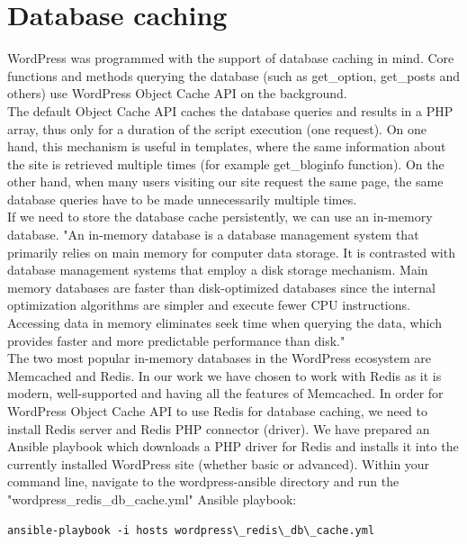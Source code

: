 \section{Database caching}

WordPress was programmed with the support of database caching in mind. Core functions and methods querying the database (such as get\_option, get\_posts and others) use WordPress Object Cache API \cite{WP:Object-Cache-API} on the background. \\

The default Object Cache API caches the database queries and results in a PHP array, thus only for a duration of the script execution (one request). On one hand, this mechanism is useful in templates, where the same information about the site is retrieved multiple times (for example get\_bloginfo function). On the other hand, when many users visiting our site request the same page, the same database queries have to be made unnecessarily multiple times. \\

If we need to store the database cache persistently, we can use an in-memory database. "An in-memory database is a database management system that primarily relies on main memory for computer data storage. It is contrasted with database management systems that employ a disk storage mechanism. Main memory databases are faster than disk-optimized databases since the internal optimization algorithms are simpler and execute fewer CPU instructions. Accessing data in memory eliminates seek time when querying the data, which provides faster and more predictable performance than disk." \cite{Wiki:in-memory-database}\\

The two most popular in-memory databases in the WordPress ecosystem are Memcached and Redis. In our work we have chosen to work with Redis as it is modern, well-supported and having all the features of Memcached. \cite{SO:Redis-vs-Memcached} In order for WordPress Object Cache API to use Redis for database caching, we need to install Redis server and Redis PHP connector (driver). We have prepared an Ansible playbook which downloads a PHP driver for Redis and installs it into the currently installed WordPress site (whether basic or advanced). Within your command line, navigate to the wordpress-ansible directory and run the "wordpress\_redis\_db\_cache.yml" Ansible playbook:

\begin{lstlisting}
ansible-playbook -i hosts wordpress\_redis\_db\_cache.yml
\end{lstlisting}

